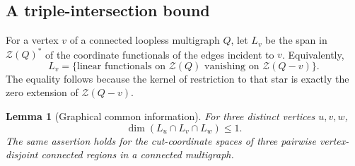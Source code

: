 \documentclass[11pt,a4paper]{article}
\numberwithin{equation}{section}
\newtheorem{lemma}[theorem]{Lemma}
\theoremstyle{definition}
\theoremstyle{remark}
\newcommand{\cZ}{\mathcal Z}
\begin{document}
\subsection{A triple-intersection bound}
For a vertex $v$ of a connected loopless multigraph $Q$, let $L_v$ be the span in $\cZ(Q)^*$ of the coordinate functionals of the edges incident to $v$. Equivalently,
\[
 L_v=\{\text{linear functionals on }\cZ(Q)\text{ vanishing on }\cZ(Q-v)\}.
\]
The equality follows because the kernel of restriction to that star is exactly the zero extension of $\cZ(Q-v)$.

\begin{lemma}[Graphical common information]\label{lem:triple}
For three distinct vertices $u,v,w$,
\[
 \dim(L_u\cap L_v\cap L_w)\le1.
\]
The same assertion holds for the cut-coordinate spaces of three pairwise vertex-disjoint connected regions in a connected multigraph.
\end{lemma}
\end{document}
